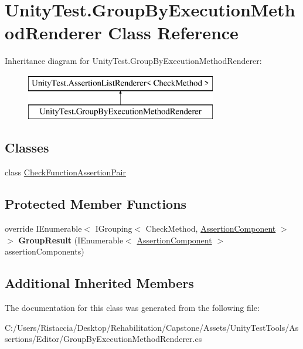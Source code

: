 \hypertarget{class_unity_test_1_1_group_by_execution_method_renderer}{}\section{Unity\+Test.\+Group\+By\+Execution\+Method\+Renderer Class Reference}
\label{class_unity_test_1_1_group_by_execution_method_renderer}
Inheritance diagram for Unity\+Test.\+Group\+By\+Execution\+Method\+Renderer\+:\begin{figure}[H]
\begin{center}
\leavevmode
\includegraphics[height=2.000000cm]{class_unity_test_1_1_group_by_execution_method_renderer}
\end{center}
\end{figure}
\subsection*{Classes}
\begin{DoxyCompactItemize}
\item 
class \hyperlink{class_unity_test_1_1_group_by_execution_method_renderer_1_1_check_function_assertion_pair}{Check\+Function\+Assertion\+Pair}
\end{DoxyCompactItemize}
\subsection*{Protected Member Functions}
\begin{DoxyCompactItemize}
\item 
\mbox{\label{class_unity_test_1_1_group_by_execution_method_renderer_a33eabffd4eac591efb390e1b33f60cdc}} 
override I\+Enumerable$<$ I\+Grouping$<$ Check\+Method, \hyperlink{class_unity_test_1_1_assertion_component}{Assertion\+Component} $>$ $>$ {\bfseries Group\+Result} (I\+Enumerable$<$ \hyperlink{class_unity_test_1_1_assertion_component}{Assertion\+Component} $>$ assertion\+Components)
\end{DoxyCompactItemize}
\subsection*{Additional Inherited Members}


The documentation for this class was generated from the following file\+:\begin{DoxyCompactItemize}
\item 
C\+:/\+Users/\+Ristaccia/\+Desktop/\+Rehabilitation/\+Capstone/\+Assets/\+Unity\+Test\+Tools/\+Assertions/\+Editor/Group\+By\+Execution\+Method\+Renderer.\+cs\end{DoxyCompactItemize}
